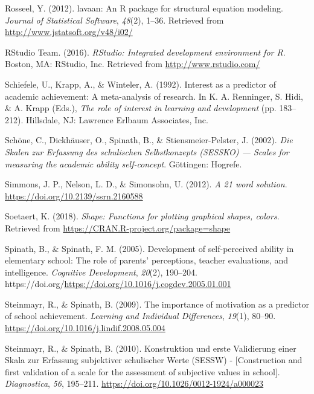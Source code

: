 \documentclass[
  man]{apa6}
\newlength{\cslhangindent}
\newlength{\cslentryspacingunit} %
\newenvironment{CSLReferences}[2] %
 {%
  \setlength{\parindent}{0pt}
  \ifodd #1
  \let\oldpar\par
  \def\par{\hangindent=\cslhangindent\oldpar}
  \fi
  \setlength{\parskip}{#2\cslentryspacingunit}
 }%
 {}
\begin{document}
\begin{CSLReferences}{1}{0}
\leavevmode{}%
Rosseel, Y. (2012). {lavaan}: An {R} package for structural equation modeling. \emph{Journal of Statistical Software}, \emph{48}(2), 1--36. Retrieved from \url{http://www.jstatsoft.org/v48/i02/}

\leavevmode{}%
RStudio Team. (2016). \emph{RStudio: Integrated development environment for {R}}. Boston, MA: RStudio, Inc. Retrieved from \url{http://www.rstudio.com/}

\leavevmode{}%
Schiefele, U., Krapp, A., \& Winteler, A. (1992). Interest as a predictor of academic achievement: A meta-analysis of research. In K. A. Renninger, S. Hidi, \& A. Krapp (Eds.), \emph{The role of interest in learning and development} (pp. 183--212). Hillsdale, NJ: Lawrence Erlbaum Associates, Inc.

\leavevmode{}%
Schöne, C., Dickhäuser, O., Spinath, B., \& Stiensmeier-Pelster, J. (2002). \emph{{Die Skalen zur Erfassung des schulischen Selbstkonzepts (SESSKO) --- Scales for measuring the academic ability self-concept}}. G{ö}ttingen: Hogrefe.

\leavevmode{}%
Simmons, J. P., Nelson, L. D., \& Simonsohn, U. (2012). \emph{A 21 word solution}. \url{https://doi.org/10.2139/ssrn.2160588}

\leavevmode{}%
Soetaert, K. (2018). \emph{Shape: Functions for plotting graphical shapes, colors}. Retrieved from \url{https://CRAN.R-project.org/package=shape}

\leavevmode{}%
Spinath, B., \& Spinath, F. M. (2005). Development of self-perceived ability in elementary school: The role of parents' perceptions, teacher evaluations, and intelligence. \emph{Cognitive Development}, \emph{20}(2), 190--204. https://doi.org/\url{https://doi.org/10.1016/j.cogdev.2005.01.001}

\leavevmode{}%
Steinmayr, R., \& Spinath, B. (2009). The importance of motivation as a predictor of school achievement. \emph{Learning and Individual Differences}, \emph{19}(1), 80--90. \url{https://doi.org/10.1016/j.lindif.2008.05.004}

\leavevmode{}%
Steinmayr, R., \& Spinath, B. (2010). {Konstruktion und erste Validierung einer Skala zur Erfassung subjektiver schulischer Werte (SESSW) - {[}Construction and first validation of a scale for the assessment of subjective values in school{]}}. \emph{Diagnostica}, \emph{56}, 195--211. \url{https://doi.org/10.1026/0012-1924/a000023}


\end{CSLReferences}
\end{document}
